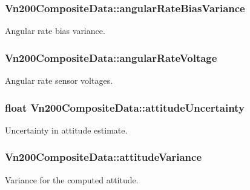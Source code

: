 \subsubsection[{\texorpdfstring{angular\+Rate\+Bias\+Variance}{angularRateBiasVariance}}]{ Vn200\+Composite\+Data\+::angular\+Rate\+Bias\+Variance}\hypertarget{structVn200CompositeData_a9186314f8efaf045fce21acb7867a79d}{}\label{structVn200CompositeData_a9186314f8efaf045fce21acb7867a79d}
Angular rate bias variance. 
\subsubsection[{\texorpdfstring{angular\+Rate\+Voltage}{angularRateVoltage}}]{ Vn200\+Composite\+Data\+::angular\+Rate\+Voltage}\hypertarget{structVn200CompositeData_ac4333c88a47d68bbe686cc1e5a1b259f}{}\label{structVn200CompositeData_ac4333c88a47d68bbe686cc1e5a1b259f}
Angular rate sensor voltages. 
\subsubsection[{\texorpdfstring{attitude\+Uncertainty}{attitudeUncertainty}}]{\setlength{\rightskip}{0pt plus 5cm}float Vn200\+Composite\+Data\+::attitude\+Uncertainty}\hypertarget{structVn200CompositeData_ab20bd8983d5de7e3d42ecf1da48b08d2}{}\label{structVn200CompositeData_ab20bd8983d5de7e3d42ecf1da48b08d2}
Uncertainty in attitude estimate. 
\subsubsection[{\texorpdfstring{attitude\+Variance}{attitudeVariance}}]{ Vn200\+Composite\+Data\+::attitude\+Variance}\hypertarget{structVn200CompositeData_a1eb5997d5a09d80689fc5c96effcb078}{}\label{structVn200CompositeData_a1eb5997d5a09d80689fc5c96effcb078}
Variance for the computed attitude. 
